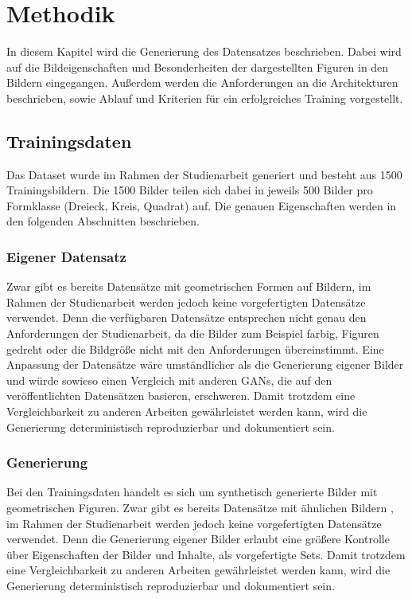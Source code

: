
\chapter{Methodik}
In diesem Kapitel wird die Generierung des Datensatzes beschrieben.
Dabei wird auf die Bildeigenschaften und Besonderheiten der dargestellten Figuren in den Bildern eingegangen.
Außerdem werden die Anforderungen an die Architekturen beschrieben, sowie Ablauf und Kriterien für ein erfolgreiches Training vorgestellt.

\section{Trainingsdaten}
Das Dataset wurde im Rahmen der Studienarbeit generiert und besteht aus 1500 Trainingsbildern.
Die 1500 Bilder teilen sich dabei in jeweils 500 Bilder pro Formklasse (Dreieck, Kreis, Quadrat) auf.
Die genauen Eigenschaften werden in den folgenden Abschnitten beschrieben.

\subsection{Eigener Datensatz}
Zwar gibt es bereits Datensätze mit geometrischen Formen auf Bildern, im Rahmen der Studienarbeit werden jedoch keine vorgefertigten Datensätze verwendet.
Denn die verfügbaren Datensätze entsprechen nicht genau den Anforderungen der Studienarbeit, da die Bilder zum Beispiel farbig, Figuren gedreht oder die Bildgröße nicht mit den Anforderungen übereinstimmt.
Eine Anpassung der Datensätze wäre umständlicher als die Generierung eigener Bilder und würde sowieso einen Vergleich mit anderen GANs, die auf den veröffentlichten Datensätzen basieren, erschweren.
Damit trotzdem eine Vergleichbarkeit zu anderen Arbeiten gewährleistet werden kann, wird die Generierung deterministisch reproduzierbar und dokumentiert sein.

\subsection{Generierung}
Bei den Trainingsdaten handelt es sich um synthetisch generierte Bilder mit geometrischen Figuren. 
Zwar gibt es bereits Datensätze mit ähnlichen Bildern \cite{dataset:2d-geometric-shapes-dataset, dataset:four-shapes}, im Rahmen der Studienarbeit werden jedoch keine vorgefertigten Datensätze verwendet. 
Denn die Generierung eigener Bilder erlaubt eine größere Kontrolle über Eigenschaften der Bilder und Inhalte, als vorgefertigte Sets.
Damit trotzdem eine Vergleichbarkeit zu anderen Arbeiten gewährleistet werden kann, wird die Generierung deterministisch reproduzierbar und dokumentiert sein.

